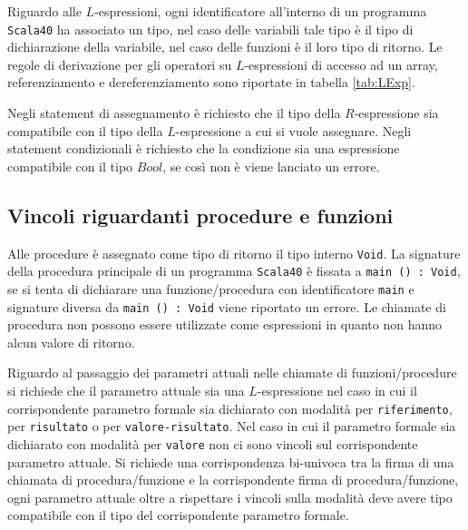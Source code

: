 Riguardo alle $L$-espressioni, ogni identificatore all'interno di un programma \texttt{Scala40} ha associato un tipo, nel caso delle variabili tale tipo è il tipo di dichiarazione della variabile, nel caso delle funzioni è il loro tipo di ritorno. Le regole di derivazione per gli operatori su $L$-espressioni di accesso ad un array, referenziamento e dereferenziamento sono riportate in tabella \ref{tab:LExp}.

\begin{table}[]
\caption{Regole di derivazione per gli operatori su $L$-espressioni.}
\label{tab:LExp}
\end{table}

Negli statement di assegnamento è richiesto che il tipo della $R$-espressione sia compatibile con il tipo della $L$-espressione a cui si vuole assegnare.
Negli statement condizionali è richiesto che la condizione sia una espressione compatibile con il tipo $Bool$, se così non è viene lanciato un errore.

\subsection*{Vincoli riguardanti procedure e funzioni}
Alle procedure è assegnato come tipo di ritorno il tipo interno \texttt{Void}.
La signature della procedura principale di un programma \texttt{Scala40} è fissata a \texttt{main () : Void}, se si tenta di dichiarare una funzione/procedura con identificatore \texttt{main} e signature diversa da \texttt{main () : Void} viene riportato un errore.
Le chiamate di procedura non possono essere utilizzate come espressioni in quanto non hanno alcun valore di ritorno.

Riguardo al passaggio dei parametri attuali nelle chiamate di funzioni/procedure si richiede che il parametro attuale sia una $L$-espressione nel caso in cui il corrispondente parametro formale sia dichiarato con modalità per \texttt{riferimento}, per \texttt{risultato} o per \texttt{valore-risultato}. Nel caso in cui il parametro formale sia dichiarato con modalità per \texttt{valore} non ci sono vincoli sul corrispondente parametro attuale.
Si richiede una corrispondenza bi-univoca tra la firma di una chiamata di procedura/funzione e la corrispondente firma di procedura/funzione, ogni parametro attuale oltre a rispettare i vincoli sulla modalità deve avere tipo compatibile con il tipo del corrispondente parametro formale.

